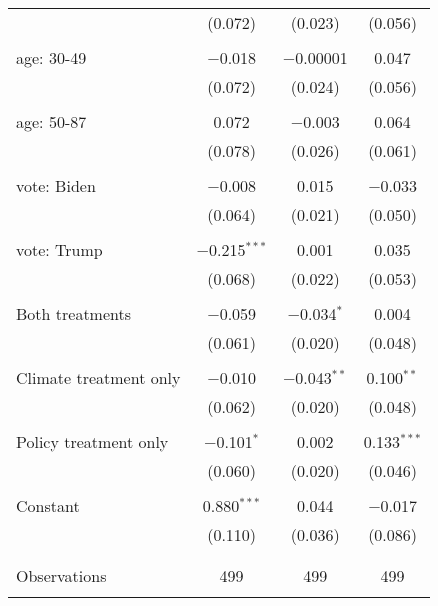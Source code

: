 \begin{tabular}{@{\extracolsep{5pt}}lccc}
  & (0.072) & (0.023) & (0.056) \\ 
  & & & \\ 
 age: 30-49 & $-$0.018 & $-$0.00001 & 0.047 \\ 
  & (0.072) & (0.024) & (0.056) \\ 
  & & & \\ 
 age: 50-87 & 0.072 & $-$0.003 & 0.064 \\ 
  & (0.078) & (0.026) & (0.061) \\ 
  & & & \\ 
 vote: Biden & $-$0.008 & 0.015 & $-$0.033 \\ 
  & (0.064) & (0.021) & (0.050) \\ 
  & & & \\ 
 vote: Trump & $-$0.215$^{***}$ & 0.001 & 0.035 \\ 
  & (0.068) & (0.022) & (0.053) \\ 
  & & & \\ 
 Both treatments & $-$0.059 & $-$0.034$^{*}$ & 0.004 \\ 
  & (0.061) & (0.020) & (0.048) \\ 
  & & & \\ 
 Climate treatment only & $-$0.010 & $-$0.043$^{**}$ & 0.100$^{**}$ \\ 
  & (0.062) & (0.020) & (0.048) \\ 
  & & & \\ 
 Policy treatment only & $-$0.101$^{*}$ & 0.002 & 0.133$^{***}$ \\ 
  & (0.060) & (0.020) & (0.046) \\ 
  & & & \\ 
 Constant & 0.880$^{***}$ & 0.044 & $-$0.017 \\ 
  & (0.110) & (0.036) & (0.086) \\ 
  & & & \\ 
\hline \\[-1.8ex] 

Observations & 499 & 499 & 499 \\ 
\hline 
\hline \\[-1.8ex] 
\end{tabular} 
